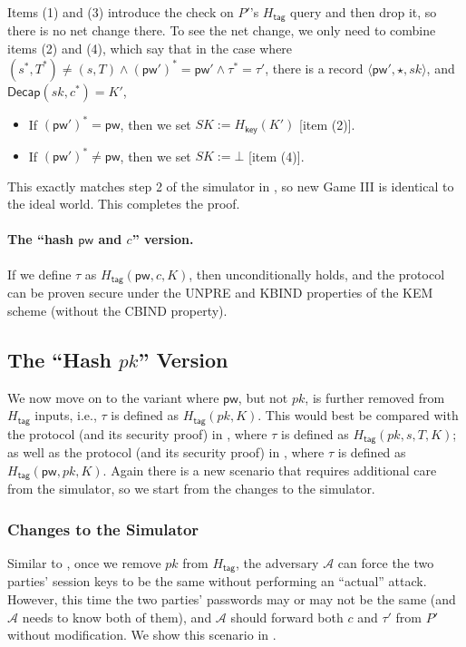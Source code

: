 \documentclass{article}
\theoremstyle{plain}
\theoremstyle{definition}
\theoremstyle{remark}
\newcommand{\adv}{\mathcal{A}}
\newcommand{\Decap}{\mathsf{Decap}}
\newcommand{\Hkey}{H_\mathsf{key}}
\newcommand{\Htag}{H_\mathsf{tag}}
\newcommand{\pw}{\mathsf{pw}}
\begin{document}
Items (1) and (3) introduce the check on $P'$'s $\Htag$ query and then drop it, so there is no net change there. To see the net change, we only need to combine items (2) and (4), which say that in the case where $(s^*,T^*) \neq (s,T) \land (\pw')^* = \pw' \land \tau^* = \tau'$, there is a record $\langle\pw',\star,sk\rangle$, and $\Decap(sk,c^*) = K'$,
\begin{itemize}
  \item If $(\pw')^* = \pw$, then we set $SK := \Hkey(K')$ [item (2)].
  \item If $(\pw')^* \neq \pw$, then we set $SK := \bot$ [item (4)].
\end{itemize}
This exactly matches step 2 of the simulator in , so new Game III is identical to the ideal world. This completes the proof.

\paragraph{The ``hash $\pw$ and $c$'' version.}
If we define $\tau$ as $\Htag(\pw,c,K)$, then  unconditionally holds, and the protocol can be proven secure under the UNPRE and KBIND properties of the KEM scheme (without the CBIND property).

\subsection{The ``Hash $pk$'' Version}
\label{app:hash-pk}
We now move on to the variant where $\pw$, but not $pk$, is further removed from $\Htag$ inputs, i.e., $\tau$ is defined as $\Htag(pk,K)$. This would best be compared with the protocol (and its security proof) in , where $\tau$ is defined as $\Htag(pk,s,T,K)$; as well as the protocol (and its security proof) in , where $\tau$ is defined as $\Htag(\pw,pk,K)$. Again there is a new scenario that requires additional care from the simulator, so we start from the changes to the simulator.

\subsubsection{Changes to the Simulator}
\label{app:hash-pk-sim}
Similar to , once we remove $pk$ from $\Htag$, the adversary $\adv$ can force the two parties' session keys to be the same without performing an ``actual'' attack. However, this time the two parties' passwords may or may not be the same (and $\adv$ needs to know both of them), and $\adv$ should forward both $c$ and $\tau'$ from $P'$ without modification. We show this scenario in .
\end{document}
